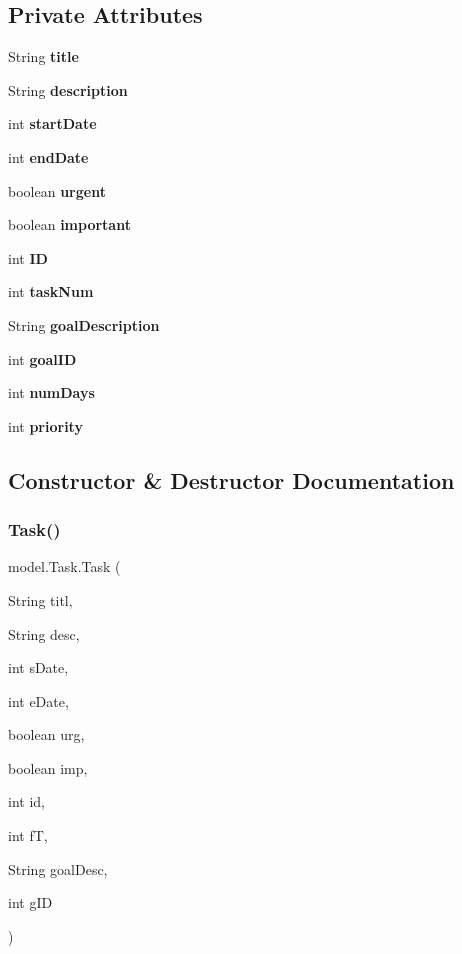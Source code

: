 \subsection*{Private Attributes}
\begin{DoxyCompactItemize}
\item 
String \textbf{ title}
\item 
String \textbf{ description}
\item 
int \textbf{ start\+Date}
\item 
int \textbf{ end\+Date}
\item 
boolean \textbf{ urgent}
\item 
boolean \textbf{ important}
\item 
int \textbf{ ID}
\item 
int \textbf{ task\+Num}
\item 
String \textbf{ goal\+Description}
\item 
int \textbf{ goal\+ID}
\item 
int \textbf{ num\+Days}
\item 
int \textbf{ priority}
\end{DoxyCompactItemize}


\subsection{Constructor \& Destructor Documentation}
\mbox{\label{classmodel_1_1_task_adf32a68fff79ea5c0b1c0d1e71b1e57b}} 
\subsubsection{Task()}
{\footnotesize\ttfamily model.\+Task.\+Task (\begin{DoxyParamCaption}\item[{String}]{titl,  }\item[{String}]{desc,  }\item[{int}]{s\+Date,  }\item[{int}]{e\+Date,  }\item[{boolean}]{urg,  }\item[{boolean}]{imp,  }\item[{int}]{id,  }\item[{int}]{fT,  }\item[{String}]{goal\+Desc,  }\item[{int}]{g\+ID }\end{DoxyParamCaption})}

